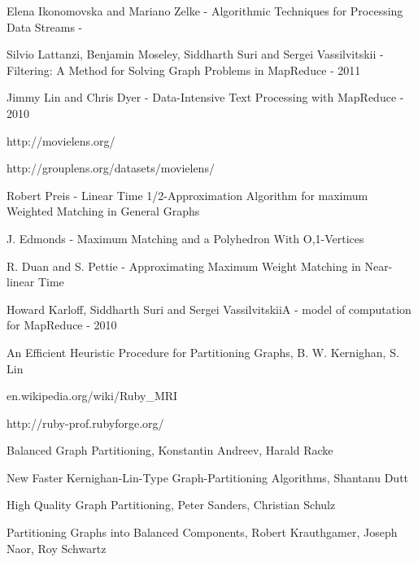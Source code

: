  \begin{thebibliography}{99}

  Elena Ikonomovska and Mariano Zelke - Algorithmic Techniques for Processing Data Streams -

  Silvio Lattanzi, Benjamin Moseley, Siddharth Suri and Sergei Vassilvitskii -Filtering: A Method for Solving Graph Problems in MapReduce - 2011
  
  Jimmy Lin and Chris Dyer - Data-Intensive Text Processing with MapReduce - 2010
  
  http://movielens.org/
  
  http://grouplens.org/datasets/movielens/
  
  Robert Preis - Linear Time 1/2-Approximation Algorithm for maximum Weighted Matching in General Graphs
  
  J. Edmonds - Maximum Matching and a Polyhedron With O,1-Vertices

  R. Duan and S. Pettie - Approximating Maximum Weight Matching in Near-linear Time

  Howard Karloff, Siddharth Suri and Sergei VassilvitskiiA -  model of computation for MapReduce - 2010

  An Efficient Heuristic Procedure for Partitioning Graphs, B. W. Kernighan, S. Lin
  
  en.wikipedia.org/wiki/Ruby\_MRI
  
  http://ruby-prof.rubyforge.org/
  
  Balanced Graph Partitioning, Konstantin Andreev, Harald Racke
  
  New Faster Kernighan-Lin-Type Graph-Partitioning Algorithms, Shantanu Dutt

  High Quality Graph Partitioning, Peter Sanders, Christian Schulz

  Partitioning Graphs into Balanced Components,
  Robert Krauthgamer, Joseph Naor, Roy Schwartz
  
  \end{thebibliography}
